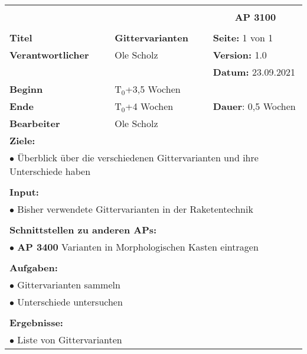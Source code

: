 \clearpage
\begin{table}[!h]
	\begin{center}
		\begin{tabular}{|p{35mm}||p{55mm}|p{50mm}||p{40mm}|}
			\hline
			\multicolumn{3}{|l||}{\textbf{}} & \multicolumn{1}{c|}{}\\
			\multicolumn{3}{|l||}{\textbf{}} & \multicolumn{1}{c|}{\textbf{AP 3100}}\\
			\multicolumn{3}{|l||}{\textbf{}} & \multicolumn{1}{c|}{}\\
			\hline\hline
			\textbf{Titel} & \multicolumn{2}{p{7cm}||}{\textbf{Gittervarianten}} 
			& \textbf{Seite:} 1 von 1\\
			\hline
			\textbf{Verantwortlicher} & \multicolumn{2}{l||}{Ole Scholz} & \textbf{Version:} 1.0\\
			\hline
			\multicolumn{3}{|l||}{} & \textbf{Datum:} 23.09.2021\\
			\hline\hline
			\textbf{Beginn} & \multicolumn{2}{l||}{T$_0$+3,5 Wochen} & \\
			\hline
			\textbf{Ende} & \multicolumn{2}{l||}{T$_0$+4 Wochen} & \textbf{Dauer}: 0,5 Wochen\\
			\hline\hline
			\textbf{Bearbeiter} & \multicolumn{3}{l|}{Ole Scholz}\\
			\hline\hline
			\multicolumn{4}{|p{150mm}|}{\textbf{Ziele:}}\\
			\multicolumn{4}{|p{150mm}|}{$\bullet$ Überblick über die verschiedenen Gittervarianten und ihre Unterschiede haben}\\
			\multicolumn{4}{|p{150mm}|}{}\\
			\multicolumn{4}{|p{150mm}|}{\textbf{Input:}}\\
			\multicolumn{4}{|p{150mm}|}{$\bullet$ Bisher verwendete Gittervarianten in der Raketentechnik}\\
			\multicolumn{4}{|p{150mm}|}{}\\
			\multicolumn{4}{|p{150mm}|}{\textbf{Schnittstellen zu anderen APs:}}\\
			\multicolumn{4}{|p{150mm}|}{$\bullet$ \textbf{AP 3400} Varianten in Morphologischen Kasten eintragen}\\
			\multicolumn{4}{|p{150mm}|}{}\\
			\multicolumn{4}{|p{150mm}|}{\textbf{Aufgaben:}}\\
			\multicolumn{4}{|p{150mm}|}{$\bullet$ Gittervarianten sammeln}\\
			\multicolumn{4}{|p{150mm}|}{$\bullet$ Unterschiede untersuchen}\\
			\multicolumn{4}{|p{150mm}|}{}\\
			\multicolumn{4}{|p{150mm}|}{\textbf{Ergebnisse:}}\\
			\multicolumn{4}{|p{150mm}|}{$\bullet$ Liste von Gittervarianten}\\
			\hline
		\end{tabular}
	\end{center}
\end{table}

